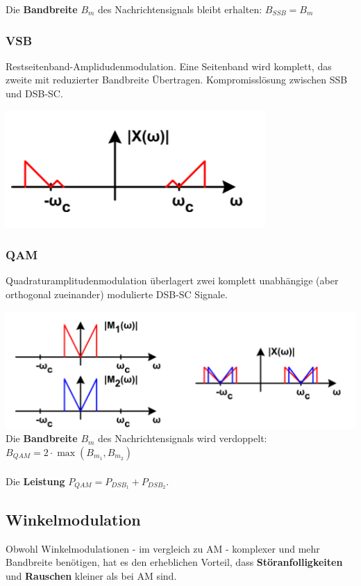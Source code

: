 \noindent Die \textbf{Bandbreite} $B_m$ des Nachrichtensignals bleibt erhalten: $B_{SSB} = B_m$

\subsubsection{VSB}
Restseitenband-Amplidudenmodulation. Eine Seitenband wird komplett, das zweite mit reduzierter Bandbreite Übertragen. Kompromisslösung zwischen SSB und DSB-SC.


\includegraphics[width=0.7\columnwidth]{Images/vsb}\\

\subsubsection{QAM}
Quadraturamplitudenmodulation überlagert zwei komplett unabhängige (aber orthogonal zueinander) modulierte DSB-SC Signale.

\includegraphics[width=0.7\columnwidth]{Images/qam}\\

\noindent Die \textbf{Bandbreite} $B_m$ des Nachrichtensignals wird verdoppelt: $B_{QAM} = 2\cdot \max(B_{m_1}, B_{m_2})$\\ ~\\
\noindent Die \textbf{Leistung} $P_{QAM} = P_{DSB_1} + P_{DSB_2}$.


\subsection{Winkelmodulation}
Obwohl Winkelmodulationen - im vergleich zu AM - komplexer und mehr Bandbreite benötigen, hat es den erheblichen Vorteil, dass \textbf{Störanfolligkeiten} und \textbf{Rauschen} kleiner als bei AM sind.

